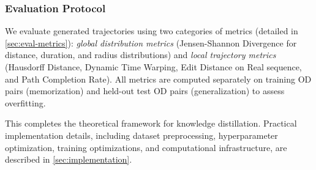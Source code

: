 \subsubsection{Evaluation Protocol}
\label{sec:method-eval-metrics}
We evaluate generated trajectories using two categories of metrics (detailed in \autoref{sec:eval-metrics}): \emph{global distribution metrics} (Jensen-Shannon Divergence for distance, duration, and radius distributions) and \emph{local trajectory metrics} (Hausdorff Distance, Dynamic Time Warping, Edit Distance on Real sequence, and Path Completion Rate). All metrics are computed separately on training OD pairs (memorization) and held-out test OD pairs (generalization) to assess overfitting.

\bigskip

This completes the theoretical framework for knowledge distillation. Practical implementation details, including dataset preprocessing, hyperparameter optimization, training optimizations, and computational infrastructure, are described in \autoref{sec:implementation}.